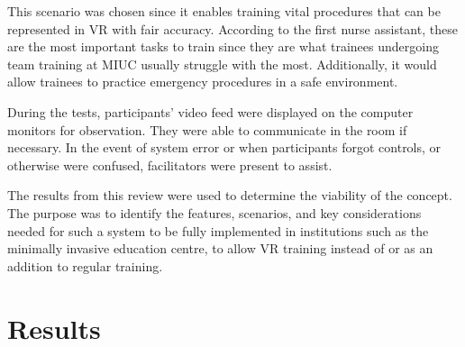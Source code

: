 \documentclass[conference]{IEEEtran}
\begin{document}
This scenario was chosen since it enables training vital procedures that can be represented in VR with fair accuracy. According to the first nurse assistant, these are the most important tasks to train since they are what trainees undergoing team training at MIUC usually struggle with the most. Additionally, it would allow trainees to practice emergency procedures in a safe environment.%


During the tests, participants' video feed were displayed on the computer monitors for observation. They were able to communicate in the room if necessary. In the event of system error or when participants forgot controls, or otherwise were confused, facilitators were present to assist. 


The results from this review were used to determine the viability of the concept. The purpose was to identify the features, scenarios, and key considerations needed for such a system to be fully implemented in institutions such as the minimally invasive education centre, to allow VR training instead of or as an addition to regular training.


\section{Results}
%
%



%
%
\end{document}
